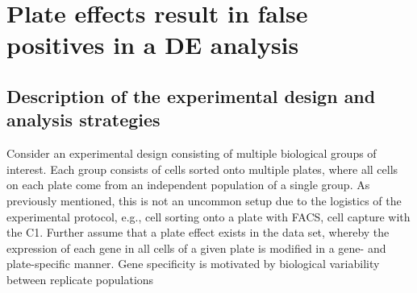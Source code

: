 \documentclass[oupdraft]{bio}
\begin{document}
\section{Plate effects result in false positives in a DE analysis}

\subsection{Description of the experimental design and analysis strategies}
Consider an experimental design consisting of multiple biological groups of interest.
Each group consists of cells sorted onto multiple plates, where all cells on each plate come from an independent population of a single group.
As previously mentioned, this is not an uncommon setup due to the logistics of the experimental protocol, e.g., cell sorting onto a plate with FACS, cell capture with the C1.
Further assume that a plate effect exists in the data set, whereby the expression of each gene in all cells of a given plate is modified in a gene- and plate-specific manner.
Gene specificity is motivated by biological variability between replicate populations
\end{document}
